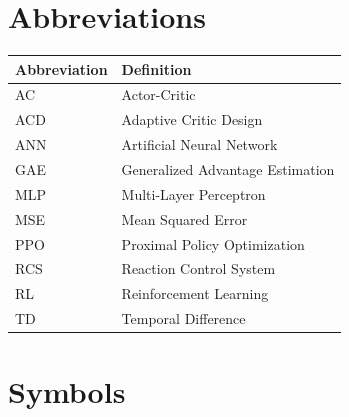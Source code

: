 \newpage
\section*{Abbreviations}

\begin{longtable}{p{2.5cm}p{10cm}}
    \toprule
    Abbreviation & Definition                       \\
    \midrule\endhead
    AC           & Actor-Critic                     \\
    ACD          & Adaptive Critic Design           \\
    ANN          & Artificial Neural Network        \\
    GAE          & Generalized Advantage Estimation \\
    MLP          & Multi-Layer Perceptron           \\
    MSE          & Mean Squared Error               \\
    PPO          & Proximal Policy Optimization     \\
    RCS          & Reaction Control System          \\
    RL           & Reinforcement Learning           \\
    TD           & Temporal Difference              \\
    \bottomrule
\end{longtable}

\section*{Symbols}

